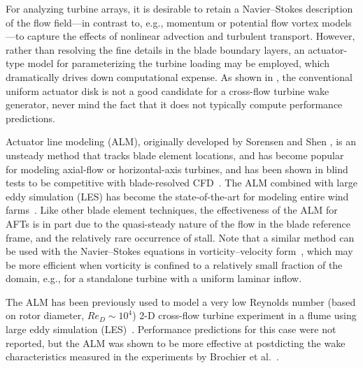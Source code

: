 \documentclass[times]{weauth}
\begin{document}

For analyzing turbine arrays, it is desirable to retain a Navier--Stokes
description of the flow field---in contrast to, e.g., momentum or potential flow
vortex models---to capture the effects of nonlinear advection and turbulent
transport. However, rather than resolving the fine details in the blade boundary
layers, an actuator-type model for parameterizing the turbine loading may be
employed, which dramatically drives down computational expense. As shown in
\cite{Bachant2015-JoT}, the conventional uniform actuator disk is not a good
candidate for a cross-flow turbine wake generator, never mind the fact that it
does not typically compute performance predictions.

Actuator line modeling (ALM), originally developed by Sorensen and Shen
\cite{Sorensen2002}, is an unsteady method that tracks blade element locations,
and has become popular for modeling axial-flow or horizontal-axis turbines, and
has been shown in blind tests to be competitive with blade-resolved
CFD~\cite{Krogstad2013, Pierella2014}. The ALM combined with large eddy
simulation (LES) has become the state-of-the-art for modeling entire wind
farms~\cite{Archer2013, Churchfield2012, Sorensen2015, Fleming2013,
Fleming2014}. Like other blade element techniques, the effectiveness of the ALM
for AFTs is in part due to the quasi-steady nature of the flow in the blade
reference frame, and the relatively rare occurrence of stall. Note that a
similar method can be used with the Navier--Stokes equations in
vorticity--velocity form~\cite{Scheurich2011b}, which may be more efficient when
vorticity is confined to a relatively small fraction of the domain, e.g., for a
standalone turbine with a uniform laminar inflow.


The ALM has been previously used to model a very low Reynolds number (based on
rotor diameter, $Re_D \sim 10^4$) 2-D cross-flow turbine experiment in a flume
using large eddy simulation (LES)~\cite{Shamsoddin2014}. Performance predictions
for this case were not reported, but the ALM was shown to be more effective at
postdicting the wake characteristics measured in the experiments by Brochier et
al.~\cite{Brochier1986}.
\end{document}
